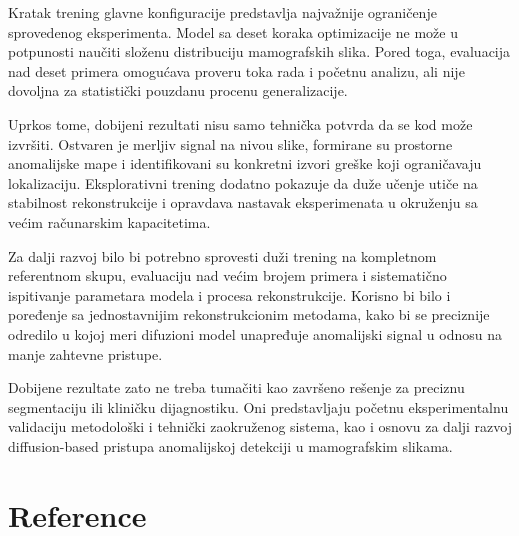\documentclass[10pt]{article}
\begin{document}
	Kratak trening glavne konfiguracije predstavlja najvažnije ograničenje sprovedenog eksperimenta. Model sa deset koraka optimizacije ne može u potpunosti naučiti složenu distribuciju mamografskih slika. Pored toga, evaluacija nad deset primera omogućava proveru toka rada i početnu analizu, ali nije dovoljna za statistički pouzdanu procenu generalizacije.
	
	Uprkos tome, dobijeni rezultati nisu samo tehnička potvrda da se kod može izvršiti. Ostvaren je merljiv signal na nivou slike, formirane su prostorne anomalijske mape i identifikovani su konkretni izvori greške koji ograničavaju lokalizaciju. Eksplorativni trening dodatno pokazuje da duže učenje utiče na stabilnost rekonstrukcije i opravdava nastavak eksperimenata u okruženju sa većim računarskim kapacitetima.
	
	Za dalji razvoj bilo bi potrebno sprovesti duži trening na kompletnom referentnom skupu, evaluaciju nad većim brojem primera i sistematično ispitivanje parametara modela i procesa rekonstrukcije. Korisno bi bilo i poređenje sa jednostavnijim rekonstrukcionim metodama, kako bi se preciznije odredilo u kojoj meri difuzioni model unapređuje anomalijski signal u odnosu na manje zahtevne pristupe.
	
	Dobijene rezultate zato ne treba tumačiti kao završeno rešenje za preciznu segmentaciju ili kliničku dijagnostiku. Oni predstavljaju početnu eksperimentalnu validaciju metodološki i tehnički zaokruženog sistema, kao i osnovu za dalji razvoj diffusion-based pristupa anomalijskoj detekciji u mamografskim slikama.
	
	\section*{Reference}
	
\end{document}
